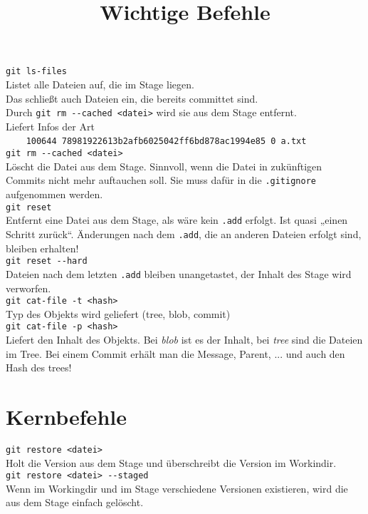 \documentclass[oneside]{scrreprt}
\title{Wichtige Befehle}
\begin{document}
\verb+git ls-files+ \\
Listet alle Dateien auf, die im Stage liegen. \\
Das schließt auch Dateien ein, die bereits committet sind. \\ 
Durch \verb+git rm --cached <datei>+ wird sie aus dem Stage entfernt.\\
Liefert Infos der Art\\
\verb+    100644 78981922613b2afb6025042ff6bd878ac1994e85 0	a.txt+
~\\ 
 
\verb+git rm --cached <datei>+\\
Löscht die Datei aus dem Stage. Sinnvoll, wenn die Datei in
zukünftigen Commits nicht mehr auftauchen soll. Sie muss dafür 
in die \verb+.gitignore+ aufgenommen werden.
~\\

\verb+git reset+\\
Entfernt eine Datei aus dem Stage, als wäre kein \verb+.add+ erfolgt. Ist quasi „einen Schritt zurück“.
Änderungen nach dem \verb+.add+, die an anderen Dateien erfolgt sind, bleiben erhalten!
~\\

\verb+git reset --hard+\\
Dateien nach dem letzten \verb+.add+ bleiben unangetastet, 
der Inhalt des Stage wird verworfen.
~\\

\verb+git cat-file -t <hash>+\\
Typ des Objekts wird geliefert (tree, blob, commit)
~\\

\verb+git cat-file -p <hash>+\\
Liefert den Inhalt des Objekts. Bei \emph{blob} ist es der Inhalt, bei \emph{tree} sind die Dateien im Tree.
Bei einem Commit erhält man die Message, Parent, ... und auch den Hash des trees! 



\section*{Kernbefehle}

\verb+git restore <datei>+\\
Holt die Version aus dem Stage und überschreibt die 
Version im Workindir.
~\\

\verb+git restore <datei> --staged+\\
Wenn im Workingdir und im Stage verschiedene Versionen
existieren, wird die aus dem Stage einfach gelöscht.\\
\end{document}
